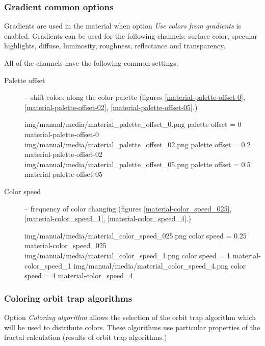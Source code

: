 \subsubsection{Gradient common options}\label{materials-gradient-common-options}

Gradients are used in the material when option \emph{Use colors from gradients} is enabled. Gradients can be used for the following channels: surface color, specular highlights, diffuse, luminosity, roughness, reflectance and transparency.

All of the channels have the following common settings:
\begin{description}
	\item[Palette offset] -- shift colors along the color palette (figures \ref{material-palette-offset-0}, \ref{material-palette-offset-02}, \ref{material-palette-offset-05}.)
	
	\threeImagesWithTwoCaptionsFullWidth
	{img/manual/media/material_palette_offset_0.png}
	{palette offset = 0}
	{material-palette-offset-0}
	{img/manual/media/material_palette_offset_02.png}
	{palette offset = 0.2}
	{material-palette-offset-02}
	{img/manual/media/material_palette_offset_05.png}
	{palette offset = 0.5}
	{material-palette-offset-05}
	
	\item[Color speed] -- frequency of color changing (figures \ref{material-color_speed_025}, \ref{material-color_speed_1}, \ref{material-color_speed_4}.)
	
	\threeImagesWithTwoCaptionsFullWidth
	{img/manual/media/material_color_speed_025.png}
	{color speed = 0.25}
	{material-color_speed_025}
	{img/manual/media/material_color_speed_1.png}
	{color speed = 1}
	{material-color_speed_1}
	{img/manual/media/material_color_speed_4.png}
	{color speed = 4}
	{material-color_speed_4}
\end{description}
	
\subsubsection{Coloring orbit trap algorithms}\label{materials-coloring-0rbi-trap-algorithms}
	
Option \emph{Coloring algorithm} allows the selection of the orbit trap algorithm which will be used to distribute colors. These algorithms use particular properties of the fractal calculation (results of orbit trap algorithms.)

